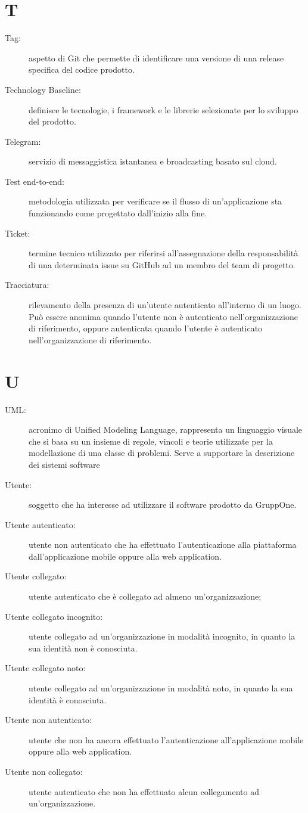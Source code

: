 \documentclass{article}
\begin{document}
  \section{T}
  \begin{description}
    \item[Tag:] aspetto di Git che permette di identificare una versione di una release specifica del codice prodotto.
    \item[Technology Baseline:] definisce le tecnologie, i framework e le librerie selezionate per lo sviluppo del prodotto.
    \item[Telegram:] servizio di messaggistica istantanea e broadcasting basato sul cloud.
    \item[Test end-to-end:] metodologia utilizzata per verificare se il flusso di un'applicazione sta funzionando come progettato dall'inizio alla fine.
    \item[Ticket:] termine tecnico utilizzato per riferirsi all'assegnazione della responsabilità di una determinata issue su GitHub ad un membro del team di progetto.
    \item[Tracciatura:] rilevamento della presenza di un'utente autenticato all'interno di un luogo. Può essere anonima quando l'utente non è autenticato nell'organizzazione di riferimento, oppure autenticata quando l'utente è autenticato nell'organizzazione di riferimento.

  \end{description}
  \newpage
  \section{U}
  \begin{description}
    \item[UML:] acronimo di Unified Modeling Language, rappresenta un linguaggio visuale che si basa su un insieme di regole, vincoli e teorie utilizzate per la modellazione di una classe di problemi. Serve a supportare la descrizione dei sistemi software
    \item[Utente:] soggetto che ha interesse ad utilizzare il software prodotto da GruppOne.
    \item[Utente autenticato:] utente non autenticato che ha effettuato l'autenticazione alla piattaforma dall'applicazione mobile oppure alla web application.
    \item[Utente collegato:] utente autenticato che è collegato ad almeno un'organizzazione;
    \item[Utente collegato incognito:] utente collegato ad un'organizzazione in modalità incognito, in quanto la sua identità non è conosciuta.
    \item[Utente collegato noto:] utente collegato ad un'organizzazione in modalità noto, in quanto la sua identità è conosciuta.
    \item[Utente non autenticato:] utente che non ha ancora effettuato l'autenticazione all'applicazione mobile oppure alla web application.
    \item[Utente non collegato:] utente autenticato che non ha effettuato alcun collegamento ad un'organizzazione.

  \end{description}
  \newpage
\end{document}
